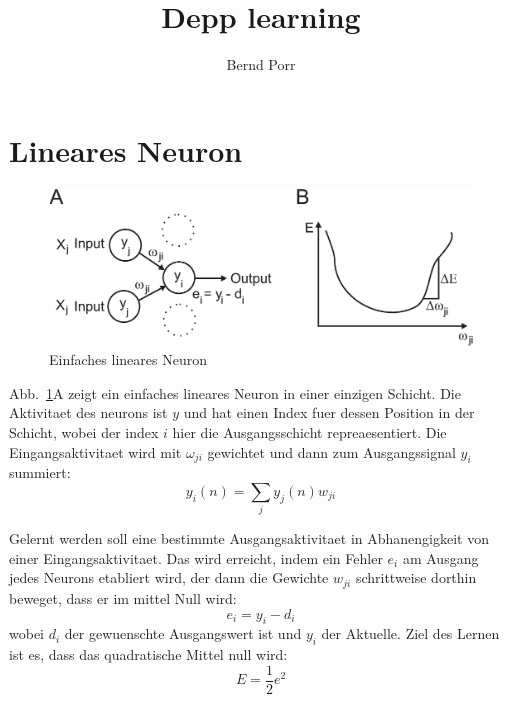 \documentclass[12pt]{article}
\author{Bernd Porr}
\title{Depp learning}
\begin{document}
\maketitle

\section{Lineares Neuron}

\begin{figure}[!hbt]
\begin{center}
\mbox{\includegraphics[width=\textwidth]{one_layer}}
\end{center}
\caption{Einfaches lineares Neuron
\label{one_layer}}
\end{figure}

Abb.~\ref{one_layer}A zeigt ein einfaches lineares Neuron in einer
einzigen Schicht. Die Aktivitaet des neurons ist $y$ und hat einen
Index fuer dessen Position in der Schicht, wobei der index $i$ hier
die Ausgangsschicht repreaesentiert. Die Eingangsaktivitaet wird mit
$\omega_{ji}$ gewichtet und dann zum Ausgangssignal $y_i$ summiert:
\begin{equation}
  y_i(n) = \sum_j y_j(n) w_{ji} \label{linear_sum}
\end{equation}

Gelernt werden soll eine bestimmte Ausgangsaktivitaet in Abhanengigkeit von einer Eingangsaktivitaet.
Das wird erreicht, indem ein Fehler $e_i$ am Ausgang jedes Neurons etabliert wird, der dann die Gewichte $w_{ji}$
schrittweise dorthin beweget, dass er im mittel Null wird:
\begin{equation}
  e_i = y_i - d_i \label{output error}
\end{equation}
wobei $d_i$ der gewuenschte Ausgangswert ist und $y_i$ der Aktuelle.
Ziel des Lernen ist es, dass das quadratische Mittel null wird:
\begin{equation}
  E = \frac{1}{2} e^2
\end{equation}
\end{document}
